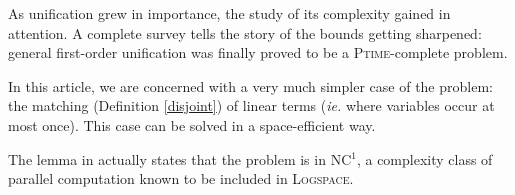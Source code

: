 




As unification grew in importance, the study of its complexity gained in attention.
A complete survey \cite{knight_unification_1989} tells the story of the bounds getting sharpened: general first-order unification was finally proved \cite{dwork_sequential_1984} to be a \textsc{Ptime}-complete problem.

\smallskip
In this article, we are concerned with a very much simpler case of the problem: the matching (Definition \ref{disjoint}) of linear terms (\textit{ie.} where variables occur at most once).
This case can be solved in a space-efficient way.


The lemma in \cite{dwork_parallel_1988} actually states that the problem is in \textsc{NC$^1$}, a complexity class of parallel computation known to be included in \textsc{Logspace}.
